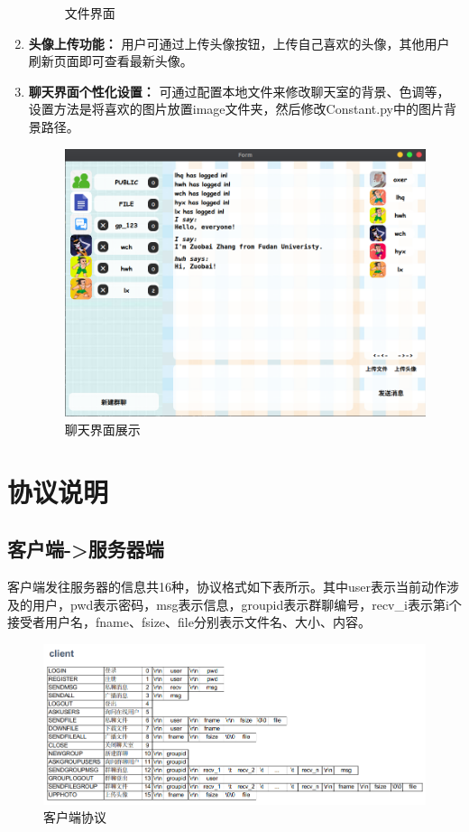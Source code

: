 \documentclass[12pt]{article} %
\begin{document}
\begin{sloppypar}
\begin{enumerate}
\begin{figure}[htbp]
		\caption{文件界面}
	\end{figure}
	\item {\bf 头像上传功能：} 用户可通过上传头像按钮，上传自己喜欢的头像，其他用户刷新页面即可查看最新头像。
	\item {\bf 聊天界面个性化设置：} 可通过配置本地文件来修改聊天室的背景、色调等，设置方法是将喜欢的图片放置image文件夹，然后修改Constant.py中的图片背景路径。
	\begin{figure}[htbp]
		\centering
		\includegraphics[width=0.9\linewidth]{figure/demo.png}
		\caption{聊天界面展示}
	\end{figure}
\end{enumerate}



\section{协议说明}

\subsection{客户端->服务器端}

客户端发往服务器的信息共16种，协议格式如下表所示。其中user表示当前动作涉及的用户，pwd表示密码，msg表示信息，groupid表示群聊编号，recv\_i表示第i个接受者用户名，fname、fsize、file分别表示文件名、大小、内容。

\begin{figure}[h]
	\centering
	\includegraphics[width=0.95\linewidth]{figure/client.png}
	\caption{客户端协议}
\end{figure}
\vspace*{-1cm}


\end{sloppypar}
\end{document}
